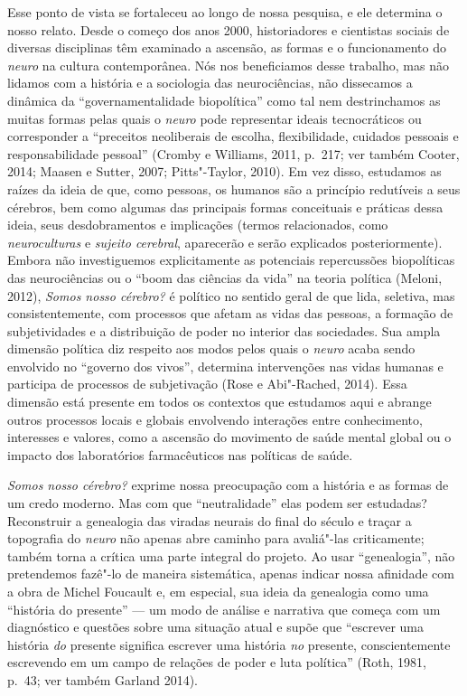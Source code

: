 Esse ponto de vista se fortaleceu ao longo de nossa pesquisa, e ele
determina o nosso relato. Desde o começo dos anos 2000, historiadores e
cientistas sociais de diversas disciplinas têm examinado a ascensão, as
formas e o funcionamento do \emph{neuro} na cultura contemporânea. Nós
nos beneficiamos desse trabalho, mas não lidamos com a história e a
sociologia das neurociências, não dissecamos a dinâmica da
``governamentalidade biopolítica'' como tal nem destrinchamos as muitas
formas pelas quais o \emph{neuro} pode representar ideais tecnocráticos
ou corresponder a ``preceitos neoliberais de escolha, flexibilidade,
cuidados pessoais e responsabilidade pessoal'' (Cromby e Williams, 2011,
p.~217; ver também Cooter, 2014; Maasen e Sutter, 2007; Pitts"-Taylor,
2010). Em vez disso, estudamos as raízes da ideia de que, como pessoas,
os humanos são a princípio redutíveis a seus cérebros, bem como algumas
das principais formas conceituais e práticas dessa ideia, seus
desdobramentos e implicações (termos relacionados, como
\emph{neuroculturas} e \emph{sujeito cerebral}, aparecerão e serão
explicados posteriormente). Embora não investiguemos explicitamente as
potenciais repercussões biopolíticas das neurociências ou o ``boom das
ciências da vida'' na teoria política (Meloni, 2012), \emph{Somos nosso
cérebro?} é político no sentido geral de que lida, seletiva, mas
consistentemente, com processos que afetam as vidas das pessoas, a
formação de subjetividades e a distribuição de poder no interior das
sociedades. Sua ampla dimensão política diz respeito aos modos pelos
quais o \emph{neuro} acaba sendo envolvido no ``governo dos vivos'',
determina intervenções nas vidas humanas e participa de processos de
subjetivação (Rose e Abi"-Rached, 2014). Essa dimensão está presente em
todos os contextos que estudamos aqui e abrange outros processos locais
e globais envolvendo interações entre conhecimento, interesses e
valores, como a ascensão do movimento de saúde mental global ou o
impacto dos laboratórios farmacêuticos nas políticas de saúde.

\emph{Somos nosso cérebro?} exprime nossa preocupação com a história e
as formas de um credo moderno. Mas com que ``neutralidade'' elas podem ser
estudadas? Reconstruir a genealogia das viradas neurais do final do
século  e traçar a topografia do \emph{neuro} não apenas abre caminho
para avaliá"-las criticamente; também torna a crítica uma parte integral
do projeto. Ao usar ``genealogia'', não pretendemos fazê"-lo de maneira
sistemática, apenas indicar nossa afinidade com a obra de Michel
Foucault e, em especial, sua ideia da genealogia como uma ``história do
presente'' --- um modo de análise e narrativa que começa com um
diagnóstico e questões sobre uma situação atual e supõe que ``escrever
uma história \emph{do} presente significa escrever uma história
\emph{no} presente, conscientemente escrevendo em um campo de relações
de poder e luta política'' (Roth, 1981, p.~43; ver também Garland 2014).

